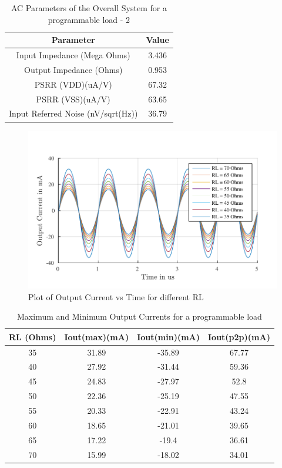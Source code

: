 \begin{table} [H]
\centering
\begin{tabular}{@{}cc@{}}
\toprule
Parameter							& Value		\\ \midrule
Input Impedance (Mega Ohms)			& 3.436 	\\
Output Impedance (Ohms)				& 0.953 	\\
PSRR (VDD)(uA/V)					& 67.32 	\\
PSRR (VSS)(uA/V)					& 63.65 	\\
Input Referred Noise (nV/sqrt(Hz))	& 36.79		\\
\bottomrule
\end{tabular}
\caption{AC Parameters of the Overall System for a programmable load - 2}
\end{table}

\begin{figure} [H]
\centering
\includegraphics[scale=1]{Figures/Plots/Ov_Sine_RL.pdf}
\caption{Plot of Output Current vs Time for different RL}
\end{figure}

\begin{table} [H]
\centering
\begin{tabular}{@{}cccc@{}}
\toprule
RL (Ohms)			& Iout(max)(mA)		& Iout(min)(mA)		& Iout(p2p)(mA) \\ \midrule
35					& 31.89 			& -35.89			& 67.77			\\
40					& 27.92 			& -31.44			& 59.36			\\
45					& 24.83 			& -27.97			& 52.8			\\
50					& 22.36 			& -25.19			& 47.55			\\
55					& 20.33 			& -22.91			& 43.24			\\
60					& 18.65 			& -21.01			& 39.65			\\
65					& 17.22 			& -19.4				& 36.61 		\\
70					& 15.99 			& -18.02			& 34.01			\\
\bottomrule
\end{tabular}
\caption{Maximum and Minimum Output Currents for a programmable load}
\end{table}

